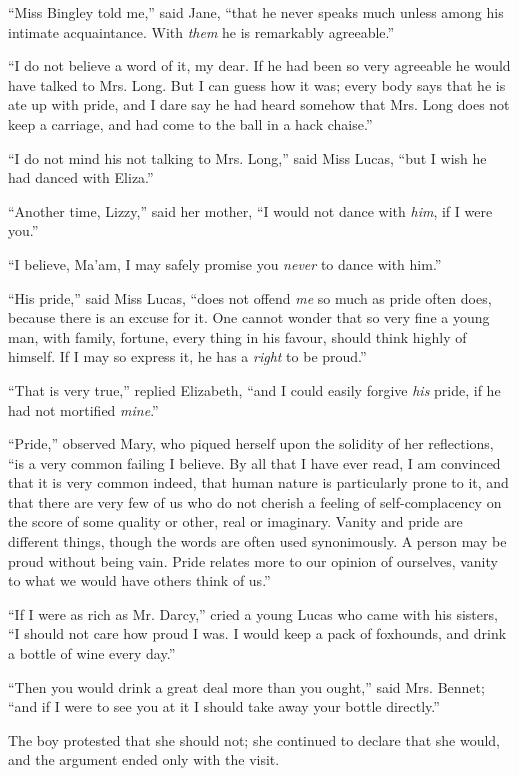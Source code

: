 “Miss Bingley told me,” said Jane, “that he never
speaks much unless among his intimate acquaintance.
With \textit{them} he is remarkably agreeable.”

“I do not believe a word of it, my dear. If he had been
so very agreeable he would have talked to Mrs. Long.
But I can guess how it was; every body says that he is
ate up with pride, and I dare say he had heard somehow
that Mrs. Long does not keep a carriage, and had come
to the ball in a hack chaise.”

“I do not mind his not talking to Mrs. Long,” said
Miss Lucas, “but I wish he had danced with Eliza.”

“Another time, Lizzy,” said her mother, “I would not
dance with \textit{him}, if I were you.”

“I believe, Ma’am, I may safely promise you \textit{never} to
dance with him.”

“His pride,” said Miss Lucas, “does not offend \textit{me} so
much as pride often does, because there is an excuse for it.
One cannot wonder that so very fine a young man, with
family, fortune, every thing in his favour, should think
highly of himself. If I may so express it, he has a \textit{right}
to be proud.”

“That is very true,” replied Elizabeth, “and I could
easily forgive \textit{his} pride, if he had not mortified \textit{mine}.”

“Pride,” observed Mary, who piqued herself upon the
solidity of her reflections, “is a very common failing I
believe. By all that I have ever read, I am convinced
that it is very common indeed, that human nature is
particularly prone to it, and that there are very few of
us who do not cherish a feeling of self-complacency on
the score of some quality or other, real or imaginary.
Vanity and pride are different things, though the words
are often used synonimously. A person may be proud
without being vain. Pride relates more to our opinion
of ourselves, vanity to what we would have others think
of us.”

“If I were as rich as Mr. Darcy,” cried a young Lucas
who came with his sisters, “I should not care how proud
I was. I would keep a pack of foxhounds, and drink
a bottle of wine every day.”

“Then you would drink a great deal more than you
ought,” said Mrs. Bennet; “and if I were to see you at
it I should take away your bottle directly.”

The boy protested that she should not; she continued
to declare that she would, and the argument ended only
with the visit.


